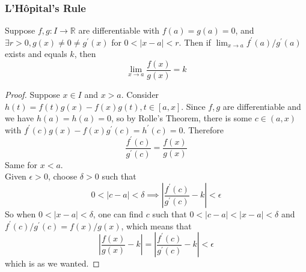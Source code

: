 \subsubsection{L'H\^opital's Rule}
\begin{proposition}
    Suppose $f,g:I\to\mathbb R$ are differentiable with $f(a)=g(a)=0$, and $\exists r>0, g(x)\neq 0\neq g^\prime(x)$ for $0<|x-a|<r$.
    Then if $\lim_{x\to a}f^\prime(a)/g^\prime(a)$ exists and equals $k$, then
    $$\lim_{x\to a}\frac{f(x)}{g(x)}=k$$
\end{proposition}
\begin{proof}
    Suppose $x\in I$ and $x>a$.
    Consider $h(t)=f(t)g(x)-f(x)g(t),t\in [a,x]$.
    Since $f,g$ are differentiable and we have $h(a)=h(a)=0$, so by Rolle's Theorem, there is some $c\in (a,x)$ with $f^\prime(c)g(x)-f(x)g^\prime(c)=h^\prime(c)=0$.
    Therefore
    $$\frac{f^\prime(c)}{g^\prime(c)}=\frac{f(x)}{g(x)}$$
    Same for $x<a$.\\
    Given $\epsilon>0$, choose $\delta>0$ such that
    $$0<|c-a|<\delta\implies\left|\frac{f^\prime(c)}{g^\prime(c)}-k\right|<\epsilon$$
    So when $0<|x-a|<\delta$, one can find $c$ such that $0<|c-a|<|x-a|<\delta$ and $f^\prime(c)/g^\prime(c)=f(x)/g(x)$, which means that
    $$\left|\frac{f(x)}{g(x)}-k\right|=\left|\frac{f^\prime(c)}{g^\prime(c)}-k\right|<\epsilon$$
    which is as we wanted.
\end{proof}
